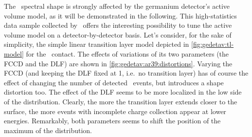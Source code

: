 The \Arl\ spectral shape is strongly affected by the germanium detector's active volume
model, as it will be demonstrated in the following. This high-statistics data sample
collected by \gerda\ offers the interesting possibility to tune the active volume model on
a detector-by-detector basis. Let's consider, for the sake of simplicity, the simple linear
transition layer model depicted in \cref{fig:gedetav:tl-model} for the \nplus\ contact.
The effects of variations of its two parameters (the FCCD and the DLF) are shown in
\cref{fig:gedetav:ar39:distortions}. Varying the FCCD (and keeping the DLF fixed at 1,
i.e.~no transition layer) has of course the effect of changing the number of detected
\Arl\ events, but introduces a shape distortion too. The effect of the DLF seems to be
more localized in the low side of the distribution. Clearly, the more the transition layer
extends closer to the surface, the more events with incomplete charge collection appear at
lower energies. Remarkably, both parameters seems to shift the position of the maximum of
the distribution.

